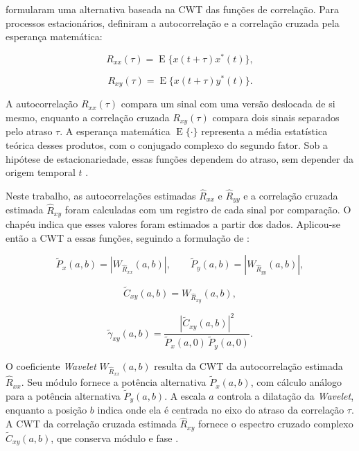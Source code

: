  formularam uma alternativa baseada na CWT das funções de
correlação. Para processos estacionários, definiram a autocorrelação e a correlação
cruzada pela esperança matemática:

\begin{equation}\label{eq:autocorr}
  R_{xx}(\tau)=\operatorname{E}\{x(t+\tau)x^*(t)\},
\end{equation}

\begin{equation}\label{eq:crosscorr}
  R_{xy}(\tau)=\operatorname{E}\{x(t+\tau)y^*(t)\}.
\end{equation}

\noindent
A autocorrelação $R_{xx}(\tau)$ compara um sinal com uma versão deslocada
de si mesmo, enquanto a correlação cruzada $R_{xy}(\tau)$ compara dois sinais
separados pelo atraso $\tau$. A esperança matemática $\operatorname{E}\{\cdot\}$
representa a média estatística teórica desses produtos, com o conjugado complexo
do segundo fator. Sob a hipótese de estacionariedade, essas funções
dependem do atraso, sem depender da origem temporal $t$ \cite{schuck2019}.

Neste trabalho, as autocorrelações estimadas $\widehat R_{xx}$ e
$\widehat R_{yy}$ e a correlação cruzada estimada $\widehat R_{xy}$ foram
calculadas com um registro de cada sinal por comparação. O chapéu indica
que esses valores foram estimados a partir dos dados. Aplicou-se então a CWT
a essas funções, seguindo a formulação de :

\begin{equation}\label{eq:wps-alt}
  \widetilde P_x(a,b)=\left|W_{\widehat R_{xx}}(a,b)\right|,
  \qquad
  \widetilde P_y(a,b)=\left|W_{\widehat R_{yy}}(a,b)\right|,
\end{equation}

\begin{equation}\label{eq:wcs-alt}
  \widetilde C_{xy}(a,b)=W_{\widehat R_{xy}}(a,b),
\end{equation}

\begin{equation}\label{eq:wco-alt}
  \widetilde\gamma_{xy}(a,b)=
  \frac{|\widetilde C_{xy}(a,b)|^2}
       {\widetilde P_x(a,0)\,\widetilde P_y(a,0)}.
\end{equation}

\noindent
O coeficiente \textit{Wavelet} $W_{\widehat R_{xx}}(a,b)$ resulta da CWT da
autocorrelação estimada $\widehat R_{xx}$. Seu módulo fornece a potência
alternativa $\widetilde P_x(a,b)$, com cálculo análogo para a potência
alternativa $\widetilde P_y(a,b)$. A escala $a$ controla a dilatação da
\textit{Wavelet}, enquanto a posição $b$ indica onde ela é centrada no eixo
do atraso da correlação $\tau$. A CWT da correlação cruzada estimada $\widehat R_{xy}$
fornece o espectro cruzado complexo $\widetilde C_{xy}(a,b)$, que conserva
módulo e fase \cite{schuck2019}.

